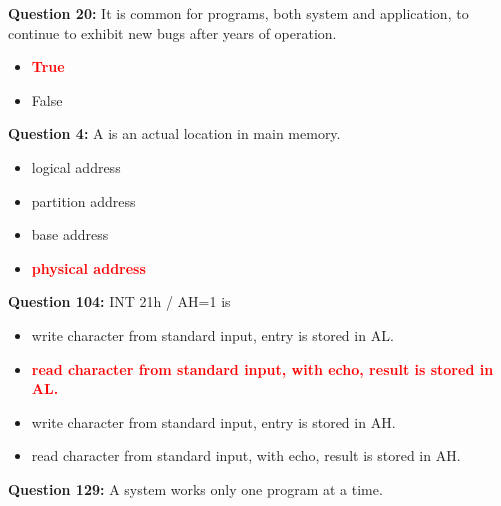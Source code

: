 \documentclass[12pt,a4paper]{article}
\begin{document}
\textbf{Question 20:} It is common for programs, both system and application, to continue to exhibit new bugs after years of operation.

\begin{itemize}
    \item[\textbf{A.}] \textcolor{red}{\textbf{True}}
    \item[\textbf{B.}] False
\end{itemize}

\vspace{0.5cm}

\vspace{0.5cm}

\textbf{Question 4:} A \underline{\hspace{1.5cm}} is an actual location in main memory.

\begin{itemize}
    \item[\textbf{A.}] logical address
    \item[\textbf{B.}] partition address
    \item[\textbf{C.}] base address
    \item[\textbf{D.}] \textcolor{red}{\textbf{physical address}}
\end{itemize}

\vspace{0.5cm}

\vspace{0.5cm}

\textbf{Question 104:} INT 21h / AH=1 is \underline{\hspace{1.5cm}}

\begin{itemize}
    \item[\textbf{A.}] write character from standard input, entry is stored in AL.
    \item[\textbf{B.}] \textcolor{red}{\textbf{read character from standard input, with echo, result is stored in AL.}}
    \item[\textbf{C.}] write character from standard input, entry is stored in AH.
    \item[\textbf{D.}] read character from standard input, with echo, result is stored in AH.
\end{itemize}

\vspace{0.5cm}

\vspace{0.5cm}

\textbf{Question 129:} A \underline{\hspace{1.5cm}} system works only one program at a time.
\end{document}

